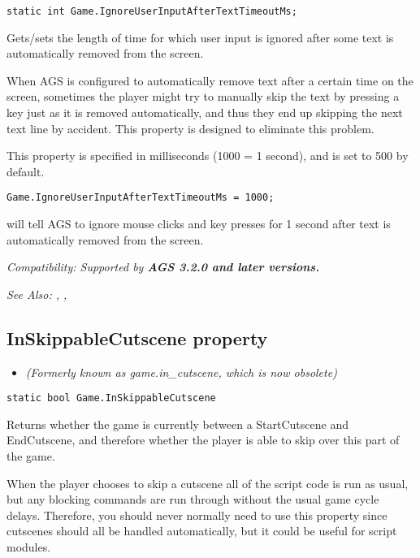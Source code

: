 \begin{verbatim}
static int Game.IgnoreUserInputAfterTextTimeoutMs;
\end{verbatim}
Gets/sets the length of time for which user input is ignored after some text is automatically
removed from the screen.

When AGS is configured to automatically remove text after a certain time on the screen,
sometimes the player might try to manually skip the text by pressing a key just as it
is removed automatically, and thus they end up skipping the next text line by accident.
This property is designed to eliminate this problem.

This property is specified in milliseconds (1000 = 1 second), and is set to 500 by default.

\begin{verbatim}
Game.IgnoreUserInputAfterTextTimeoutMs = 1000;
\end{verbatim}
will tell AGS to ignore mouse clicks and key presses for 1 second after text is automatically
removed from the screen.

\it{Compatibility:} Supported by \bf{AGS 3.2.0} and later versions.

\it{See Also:} ,
, 


\subsection{InSkippableCutscene property}\label{Game.InSkippableCutscene}%

\begin{itemize}
\item \it{(Formerly known as game.in_cutscene, which is now obsolete)}
\end{itemize}

\begin{verbatim}
static bool Game.InSkippableCutscene
\end{verbatim}
Returns whether the game is currently between a StartCutscene and EndCutscene, and therefore
whether the player is able to skip over this part of the game.

When the player chooses to skip a cutscene all of the script code is run as usual,
but any blocking commands are run through without the usual game cycle delays. Therefore, you
should never normally need to use this property since cutscenes should all be handled automatically,
but it could be useful for script modules.

